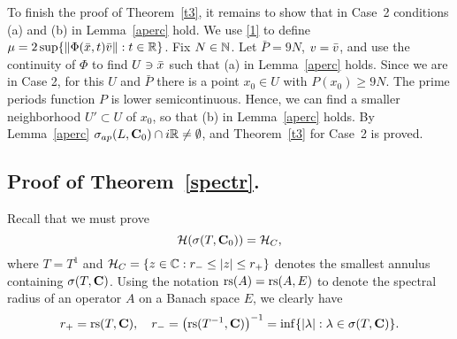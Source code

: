 To finish the proof of  Theorem~\ref{t3}, it remains to
show that in  Case~2 conditions (a) and (b) in Lemma~\ref{aperc}
hold. We use \eqref{1} to define 
$\mu=2\sup\{\|\Phi({\bar x},t){\bar v}\|: t\in{\Bbb{R}}\}$.
Fix $N\in{\Bbb{N}}$. Let $\bar{P}=9N$, $v={\bar v}$, and use the continuity
of $\Phi$ to find $U\ni {\bar x}$ such that (a) 
in Lemma~\ref{aperc} holds. Since we are in  Case 2,
for this $U$ and $\bar{P}$ there is a point 
$x_0\in U$ with $P(x_0)\geq 9N$.
The prime periods function $P$   is lower semicontinuous.
Hence, we can find a smaller neighborhood  $U'\subset U$ of $x_0$, 
so that (b)  in Lemma~\ref{aperc} holds. 
By Lemma~\ref{aperc}  $\sigma_{ap} (L,{{\bold C}_0}) \cap i{\Bbb{R}} \neq \emptyset$,
and Theorem~\ref{t3} for Case~2 is proved.


\subsection{Proof of Theorem~\ref{spectr}.}
Recall that we must prove
\begin{equation}\lb{spechul2}
 \calH(\sig(T, \cnd))=\calH_C,
 \end{equation}
where $T=T^1$ and
${\cal{H}}_C=\{z\in{\Bbb{C}}: r_- \leq|z| \leq r_+\}$ denotes
the smallest  annulus containing $\sigma(T, {\bold C})$. 
Using the notation
$\operatorname{rs}(A)=\operatorname{rs}(A,E)$ to denote the
spectral radius of an operator $A$ on a Banach space $E$, 
we clearly have
\[
r_+  =  \operatorname{rs}(T,{\bold C}),\quad
r_-  =  \left(\operatorname{rs}(T^{-1}, {\bold C})\right)^{-1}=
\inf\{|\lambda|:\lambda\in\sigma(T,{\bold C})\}.
\]

